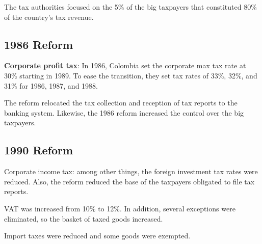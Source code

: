 \documentclass[
  12pt]{article}
\theoremstyle{definition}
\theoremstyle{remark}
\begin{document}
The tax authorities focused on the 5\% of the big taxpayers that
constituted 80\% of the country's tax revenue.

\hypertarget{reform-1}{%
\subsection{1986 Reform}\label{reform-1}}

\textbf{Corporate profit tax}: In 1986, Colombia set the corporate max
tax rate at 30\% starting in 1989. To ease the transition, they set tax
rates of 33\%, 32\%, and 31\% for 1986, 1987, and 1988.

The reform relocated the tax collection and reception of tax reports to
the banking system. Likewise, the 1986 reform increased the control over
the big taxpayers.

\hypertarget{reform-2}{%
\subsection{1990 Reform}\label{reform-2}}

Corporate income tax: among other things, the foreign investment tax
rates were reduced. Also, the reform reduced the base of the taxpayers
obligated to file tax reports.

VAT was increased from 10\% to 12\%. In addition, several exceptions
were eliminated, so the basket of taxed goods increased.

Import taxes were reduced and some goods were exempted.


  
\end{document}
